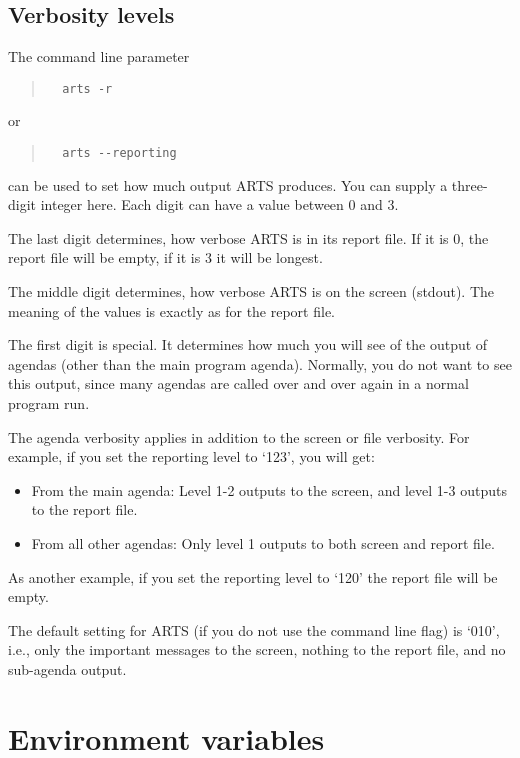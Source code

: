 \subsection*{Verbosity levels}

The command line parameter 
\begin{quote}
\begin{verbatim}
  arts -r
\end{verbatim}
\end{quote}
or
\begin{quote}
\begin{verbatim}
  arts --reporting
\end{verbatim}
\end{quote}
can be used to set how much output ARTS produces. You can supply a
three-digit integer here. Each digit can have a value between 0 and 3.

The last digit determines, how verbose ARTS is in its report file. If
it is 0, the report file will be empty, if it is 3 it will be longest.

The middle digit determines, how verbose ARTS is on the screen
(stdout). The meaning of the values is exactly as for the report
file. 

The first digit is special. It determines how much you will see of the
output of agendas (other than the main program agenda). Normally, you
do not want to see this output, since many agendas are called over and
over again in a normal program run. 

The agenda verbosity applies in addition to the screen or file
verbosity. For example, if you set the reporting level to `123', you
will get: 
\begin{itemize}
\item From the main agenda: Level 1-2 outputs to the screen, and level
  1-3 outputs to the report file.
\item From all other agendas: Only level 1 outputs to both screen and
  report file.
\end{itemize}
As another example, if you set the reporting level to `120' the
report file will be empty.

The default setting for ARTS (if you do not use the command line flag)
is `010', i.e., only the important messages to the screen, nothing to
the report file, and no sub-agenda output.



\section{Environment variables}
\label{sec:concept:envvars}

